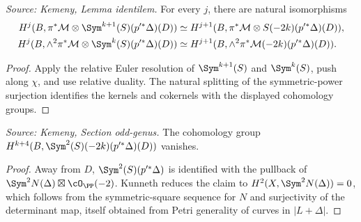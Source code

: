 \begin{lemma}
  \label{lem:kemeny_odd_identilem}
  \textit{Source: Kemeny, Lemma identilem.}
  For every \(j\), there are natural isomorphisms
  \[
  \begin{aligned}
    H^j(B,\pi^*\mathcal M\otimes\Sym^{k+1}(S)(p'^*\Delta)(D))
      &\simeq H^{j+1}(B,\pi^*\mathcal M\otimes S(-2k)(p'^*\Delta)(D)),\\
    H^j(B,\wedge^2\pi^*\mathcal M\otimes\Sym^k(S)(p'^*\Delta)(D))
      &\simeq H^{j+1}(B,\wedge^2\pi^*\mathcal M(-2k)(p'^*\Delta)(D)).
  \end{aligned}
  \]
\end{lemma}
\begin{proof}
  Apply the relative Euler resolution of \(\Sym^{k+1}(S)\) and \(\Sym^k(S)\),
  push along \(\chi\), and use relative duality.  The natural splitting of the
  symmetric-power surjection identifies the kernels and cokernels with the
  displayed cohomology groups.
\end{proof}

\begin{lemma}
  \label{lem:kemeny_odd_sym2S_vanishing}
  \textit{Source: Kemeny, Section odd-genus.}
  The cohomology group
  \(H^{k+4}(B,\Sym^2(S)(-2k)(p'^*\Delta)(D))\) vanishes.
\end{lemma}
\begin{proof}
  Away from \(D\), \(\Sym^2(S)(p'^*\Delta)\) is identified with the pullback of
  \(\Sym^2N(\Delta)\boxtimes\cO_{\PP}(-2)\).  Kunneth reduces the claim to
  \(H^2(X,\Sym^2N(\Delta))=0\), which follows from the symmetric-square sequence
  for \(N\) and surjectivity of the determinant map, itself obtained from Petri
  generality of curves in \(|L+\Delta|\).
\end{proof}


